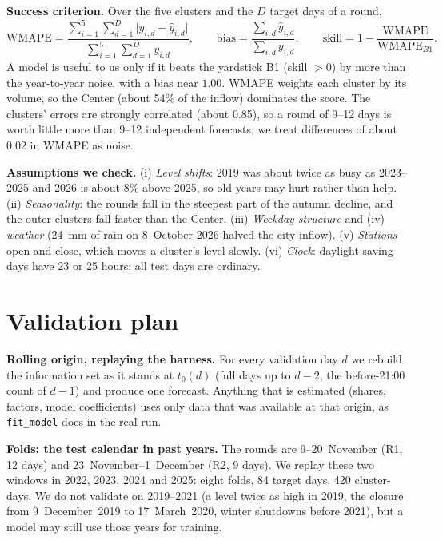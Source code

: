 \documentclass[10pt,a4paper]{article}
\begin{document}
\textbf{Success criterion.} Over the five clusters and the $D$ target days of a round,
\[
  \mathrm{WMAPE} = \frac{\sum_{i=1}^{5}\sum_{d=1}^{D}\lvert y_{i,d}-\hat y_{i,d}\rvert}
                        {\sum_{i=1}^{5}\sum_{d=1}^{D} y_{i,d}},
  \qquad
  \text{bias} = \frac{\sum_{i,d}\hat y_{i,d}}{\sum_{i,d} y_{i,d}},
  \qquad
  \text{skill} = 1-\frac{\mathrm{WMAPE}}{\mathrm{WMAPE}_{B1}} .
\]
A model is useful to us only if it beats the yardstick B1 (skill $>0$) by more than the
year-to-year noise, with a bias near $1.00$. WMAPE weights each cluster by its volume, so the
Center (about 54\% of the inflow) dominates the score. The clusters' errors are strongly
correlated (about 0.85), so a round of 9--12 days is worth little more than 9--12 independent
forecasts; we treat differences of about $0.02$ in WMAPE as noise.

\textbf{Assumptions we check.}
(i) \emph{Level shifts}: 2019 was about twice as busy as 2023--2025 and 2026 is about 8\% above
2025, so old years may hurt rather than help.
(ii) \emph{Seasonality}: the rounds fall in the steepest part of the autumn decline, and the outer
clusters fall faster than the Center.
(iii) \emph{Weekday structure} and (iv) \emph{weather} (24~mm of rain on 8~October 2026 halved the
city inflow).
(v) \emph{Stations} open and close, which moves a cluster's level slowly.
(vi) \emph{Clock}: daylight-saving days have 23 or 25 hours; all test days are ordinary.

\section{Validation plan}

\textbf{Rolling origin, replaying the harness.} For every validation day $d$ we rebuild the
information set as it stands at $t_0(d)$ (full days up to $d-2$, the before-21:00 count of
$d-1$) and produce one forecast. Anything that is estimated (shares, factors, model coefficients)
uses only data that was available at that origin, as \texttt{fit\_model} does in the real run.

\textbf{Folds: the test calendar in past years.} The rounds are 9--20~November (R1, 12 days) and
23~November--1~December (R2, 9 days). We replay these two windows in 2022, 2023, 2024 and 2025:
eight folds, 84 target days, 420 cluster-days. We do not validate on 2019--2021 (a level twice as
high in 2019, the closure from 9~December~2019 to 17~March~2020, winter shutdowns before 2021),
but a model may still use those years for training.
\end{document}
